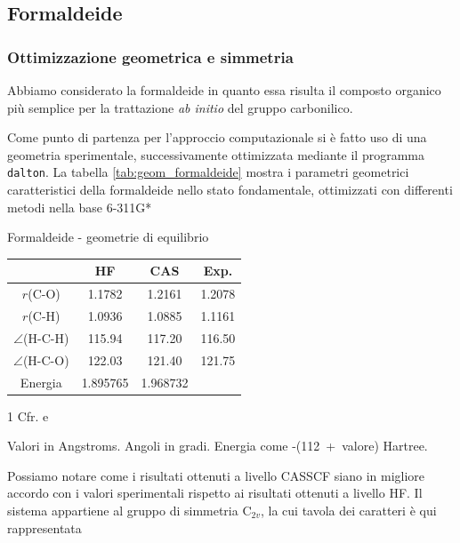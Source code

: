 \subsection{Formaldeide}

\subsubsection{Ottimizzazione geometrica e simmetria}

Abbiamo considerato la formaldeide in quanto essa risulta il composto
organico pi\`u semplice
per la trattazione \textit{ab initio} del gruppo carbonilico. 

Come punto di partenza per l'approccio computazionale si \`e fatto uso di
una geometria sperimentale, successivamente ottimizzata mediante il programma
\texttt{dalton}. La tabella \ref{tab:geom_formaldeide} mostra i parametri geometrici
caratteristici della formaldeide nello stato fondamentale, ottimizzati con
differenti metodi nella base 6-311G*

\begin{center}
\begin{threeparttable}
\caption{\small Formaldeide - geometrie di equilibrio}
\label{tab:geom_formaldeide}
\small
\begin{tabular}{|c|ccc|}
\hline
					& HF			& CAS			 	&  Exp.\tnote{1} \\
\hline
$r$(C-O)			&  1.1782		& 1.2161			&  1.2078 \\
$r$(C-H)			&  1.0936	 	& 1.0885 			&  1.1161 \\
$\angle$(H-C-H)		&  115.94 	 	& 117.20			&  116.50 \\
$\angle$(H-C-O)		&  122.03 	 	& 121.40			&  121.75 \\
Energia				&  1.895765 	& 1.968732			&         \\
\hline
\end{tabular}
\begin{tablenotes}
 \item[1] \small Cfr. \cite{jpsj-18-1963-1174} e \cite{jpc-97-17-1993-4293}
 \item[] \small Valori in Angstroms. Angoli in gradi. Energia come \mbox{-(112 + valore)} Hartree.

\end{tablenotes}
\end{threeparttable}
\end{center}

Possiamo notare come i risultati ottenuti a livello CASSCF siano in
migliore accordo con i valori sperimentali rispetto ai risultati ottenuti a
livello HF.
Il sistema appartiene al gruppo di simmetria C$_{2v}$, la cui tavola dei
caratteri \`e qui rappresentata

